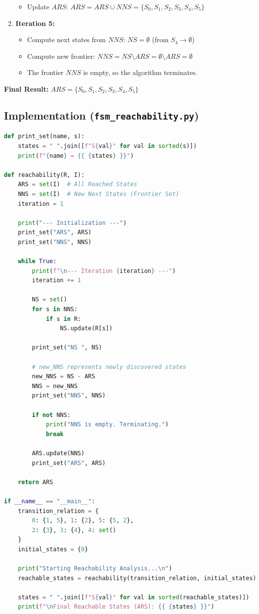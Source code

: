 \documentclass[12pt,a4paper]{article}
\begin{document}
\begin{enumerate}
\begin{itemize}
        \item Update $ARS$: $ARS = ARS \cup NNS = \{S_0, S_1, S_2, S_3, S_4, S_5\}$
    \end{itemize}
    \item \textbf{Iteration 5:}
    \begin{itemize}
        \item Compute next states from $NNS$: $NS = \emptyset$ (from $S_4 \rightarrow \emptyset$)
        \item Compute new frontier: $NNS = NS \setminus ARS = \emptyset \setminus ARS = \emptyset$
        \item The frontier $NNS$ is empty, so the algorithm terminates.
    \end{itemize}
\end{enumerate}

\textbf{Final Result:} $ARS = \{S_0, S_1, S_2, S_3, S_4, S_5\}$

\subsection{Implementation (\texttt{fsm\_reachability.py})}
\begin{lstlisting}[language=Python]
def print_set(name, s):
    states = " ".join([f"S{val}" for val in sorted(s)])
    print(f"{name} = {{ {states} }}")

def reachability(R, I):
    ARS = set(I)  # All Reached States
    NNS = set(I)  # New Next States (Frontier Set)
    iteration = 1

    print("--- Initialization ---")
    print_set("ARS", ARS)
    print_set("NNS", NNS)

    while True:
        print(f"\n--- Iteration {iteration} ---")
        iteration += 1
        
        NS = set()
        for s in NNS:
            if s in R:
                NS.update(R[s])
                
        print_set("NS ", NS)

        # new_NNS represents newly discovered states
        new_NNS = NS - ARS
        NNS = new_NNS
        print_set("NNS", NNS)

        if not NNS:
            print("NNS is empty. Terminating.")
            break
            
        ARS.update(NNS)
        print_set("ARS", ARS)

    return ARS

if __name__ == "__main__":
    transition_relation = {
        0: {1, 5}, 1: {2}, 5: {5, 2},
        2: {3}, 3: {4}, 4: set()
    }
    initial_states = {0}
    
    print("Starting Reachability Analysis...\n")
    reachable_states = reachability(transition_relation, initial_states)

    states = " ".join([f"S{val}" for val in sorted(reachable_states)])
    print(f"\nFinal Reachable States (ARS): {{ {states} }}")
\end{lstlisting}
\end{document}
